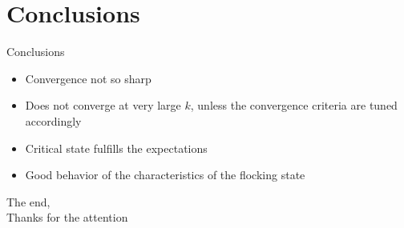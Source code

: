 \documentclass{beamer}
\begin{document}
\section{Conclusions}
\begin{frame}{Conclusions}
	\begin{itemize}
		\item Convergence not so sharp \cite{_workflow_2015}
		\vspace{0.5cm}
		\item Does not converge at very large $k$, unless the convergence criteria are tuned accordingly
		\vspace{0.5cm}
		\item Critical state fulfills the expectations
		\vspace{0.5cm}
		\item Good behavior of the characteristics of the flocking state
	\end{itemize}
\end{frame}

\begin{frame}{}
	The end,\\
	Thanks for the attention
	
	
\end{frame}
\end{document}
